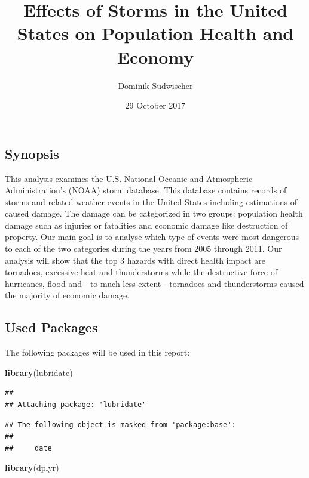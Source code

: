 \documentclass[]{article}
\title{Effects of Storms in the United States on Population Health and Economy}
\author{Dominik Sudwischer}
\date{29 October 2017}
\newenvironment{Shaded}{\begin{snugshade}}{\end{snugshade}}
\newcommand{\KeywordTok}[1]{\textcolor[rgb]{0.13,0.29,0.53}{\textbf{{#1}}}}
\newcommand{\NormalTok}[1]{{#1}}
\begin{document}
\maketitle

\subsection{Synopsis}\label{synopsis}

This analysis examines the U.S. National Oceanic and Atmospheric
Administration's (NOAA) storm database. This database contains records
of storms and related weather events in the United States including
estimations of caused damage. The damage can be categorized in two
groups: population health damage such as injuries or fatalities and
economic damage like destruction of property. Our main goal is to
analyse which type of events were most dangerous to each of the two
categories during the years from 2005 through 2011. Our analysis will
show that the top 3 hazards with direct health impact are tornadoes,
excessive heat and thunderstorms while the destructive force of
hurricanes, flood and - to much less extent - tornadoes and
thunderstorms caused the majority of economic damage.

\subsection{Used Packages}\label{used-packages}

The following packages will be used in this report:

\begin{Shaded}
\begin{Highlighting}[]
\KeywordTok{library}\NormalTok{(lubridate)}
\end{Highlighting}
\end{Shaded}

\begin{verbatim}
## 
## Attaching package: 'lubridate'
\end{verbatim}

\begin{verbatim}
## The following object is masked from 'package:base':
## 
##     date
\end{verbatim}

\begin{Shaded}
\begin{Highlighting}[]
\KeywordTok{library}\NormalTok{(dplyr)}
\end{Highlighting}
\end{Shaded}
\end{document}
